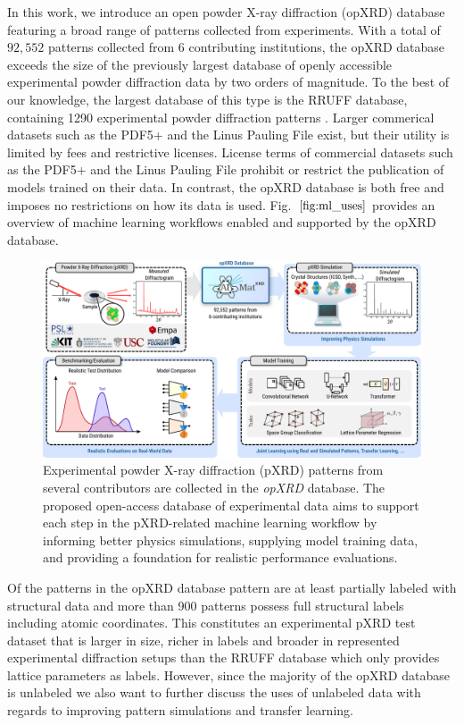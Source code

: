 In this work, we introduce an open powder X-ray diffraction (opXRD) database featuring a broad range of patterns collected from experiments. With a total of $92,552$ patterns collected from 6 contributing institutions, the opXRD database exceeds the size of the previously largest database of openly accessible experimental powder diffraction data by two orders of magnitude. To the best of our knowledge, the largest database of this type is the RRUFF database, containing 1290 experimental powder diffraction patterns \cite{lafuente2015}. Larger commerical datasets such as the PDF5+\cite{GatesRector2019} and the Linus Pauling File\cite{villars2018} exist, but their utility is limited by fees and restrictive licenses. License terms of commercial datasets such as the PDF5+ and the Linus Pauling File prohibit or restrict the publication of models trained on their data. In contrast, the opXRD database is both free and imposes no restrictions on how its data is used. Fig.~$\eqref{fig:ml_uses}$ provides an overview of machine learning workflows enabled and supported by the opXRD database. \\

\begin{figure}[!htb]
    \centering
    \includegraphics[width=1.0\linewidth]{figures/pipeline.pdf}
    \caption{Experimental powder X-ray diffraction (pXRD) patterns from several contributors are collected in the \textit{opXRD} database. The proposed open-access database of experimental data aims to support each step in the pXRD-related machine learning workflow by informing better physics simulations, supplying model training data, and providing a foundation for realistic performance evaluations.}
    \label{fig:ml_uses}
\end{figure}

Of the \numpatterns patterns in the opXRD database \numlabeled pattern are at least partially labeled with structural data and more than 900 patterns possess full structural labels including atomic coordinates. This constitutes an experimental pXRD test dataset that is larger in size, richer in labels and broader in represented experimental diffraction setups than the RRUFF database which only provides lattice parameters as labels\cite{Armbruster2015}. However, since the majority of the opXRD database is unlabeled we also want to further discuss the uses of unlabeled data with regards to improving pattern simulations and transfer learning. \\

